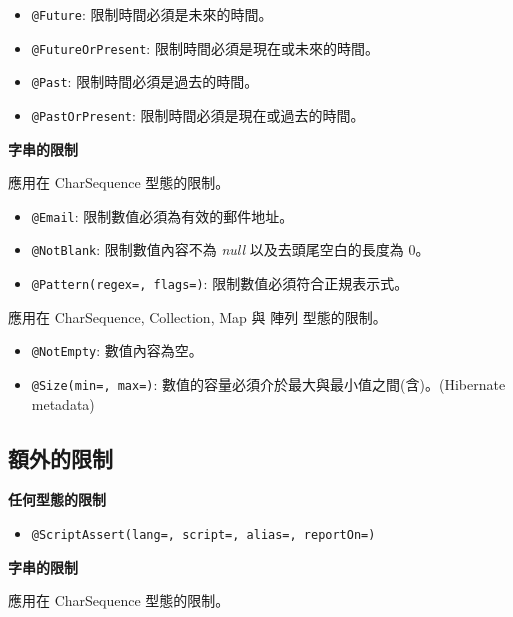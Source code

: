\begin{itemize}
\item \texttt{@Future}: 限制時間必須是未來的時間。
\item \texttt{@FutureOrPresent}: 限制時間必須是現在或未來的時間。
\item \texttt{@Past}: 限制時間必須是過去的時間。
\item \texttt{@PastOrPresent}: 限制時間必須是現在或過去的時間。
\end{itemize}

\noindent\textbf{字串的限制}

\vspace{10pt}

應用在 CharSequence 型態的限制。

\begin{itemize}
\item \texttt{@Email}: 限制數值必須為有效的郵件地址。
\item \texttt{@NotBlank}: 限制數值內容不為 \textit{null} 以及去頭尾空白的長度為 0。
\item \texttt{@Pattern(regex=, flags=)}: 限制數值必須符合正規表示式。
\end{itemize}

應用在 CharSequence, Collection, Map 與 陣列 型態的限制。

\begin{itemize}
\item \texttt{@NotEmpty}: 數值內容為空。
\item \texttt{@Size(min=, max=)}: 數值的容量必須介於最大與最小值之間(含)。(Hibernate metadata)
\end{itemize}

\subsection{額外的限制}

\noindent\textbf{任何型態的限制}\vspace{10pt}

\begin{itemize}
\item \texttt{@ScriptAssert(lang=, script=, alias=, reportOn=)}
\end{itemize}

\noindent\textbf{字串的限制}\vspace{10pt}

應用在 CharSequence 型態的限制。

